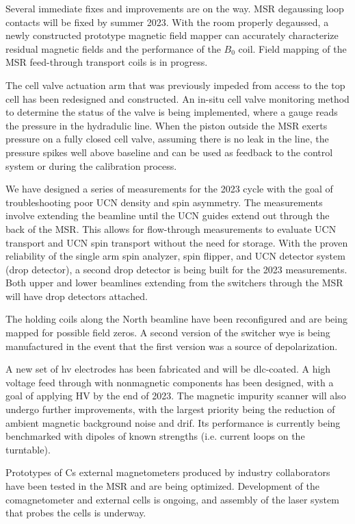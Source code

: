 Several immediate fixes and improvements are on the way. MSR degaussing loop contacts will be fixed by summer 2023. With the room properly degaussed, a newly constructed prototype magnetic field mapper can accurately characterize residual magnetic fields and the performance of the $B_0$ coil. Field mapping of the MSR feed-through transport coils is in progress. 

The cell valve actuation arm that was previously impeded from access to the top cell has been redesigned and constructed. An in-situ cell valve monitoring method to determine the status of the valve is being implemented, where a gauge reads the pressure in the hydradulic line. When the piston outside the MSR exerts pressure on a fully closed cell valve, assuming there is no leak in the line, the pressure spikes well above baseline and can be used as feedback to the control system or during the calibration process.

We have designed a series of measurements for the 2023 cycle with the goal of troubleshooting poor UCN density and spin asymmetry. The measurements involve extending the beamline until the UCN guides extend out through the back of the MSR. This allows for flow-through measurements to evaluate UCN transport and UCN spin transport without the need for storage. With the proven reliability of the single arm spin analyzer, spin flipper, and UCN detector system (drop detector), a second drop detector is being built for the 2023 measurements. Both upper and lower beamlines extending from the switchers through the MSR will have drop detectors attached. 

The holding coils along the North beamline have been reconfigured and are being mapped for possible field zeros. A second version of the switcher wye is being manufactured in the event that the first version was a source of depolarization.

A new set of \acrshort{hv} electrodes has been fabricated and will be \acrshort{dlc}-coated. A high voltage feed through with nonmagnetic components has been designed, with a goal of applying HV by the end of 2023. The magnetic impurity scanner will also undergo further improvements, with the largest priority being the reduction of ambient magnetic background noise and drif. Its performance is currently being benchmarked with dipoles of known strengths (i.e. current loops on the turntable).

Prototypes of Cs external magnetometers produced by industry collaborators have been tested in the MSR and are being optimized. Development of the \hg comagnetometer and external \hg cells is ongoing, and assembly of the laser system that probes the \hg cells is underway.
